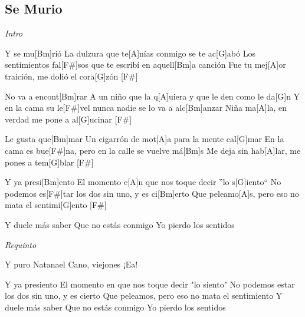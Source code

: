 \subsection{Se Murio}
\noindent

\vspace{1cm}

\begin{guitar}
	\begin{multicols}{2}
		\textit{Intro}
		\par

		Y se mu[Bm]rió
		La dulzura que te[A]nías conmigo se te ac[G]abó
		Los sentimientos fal[F#]sos que te escribí en aquell[Bm]a canción
		Fue tu mej[A]or traición, me dolió el cora[G]zón [F#] \par
		No va a encont[Bm]rar
		A un niño que la q[A]uiera y que le den como le da[G]n
		Y en la cama su le[F#]vel nunca nadie se lo va a alc[Bm]anzar
		Niña ma[A]la, en verdad me pone a al[G]ucinar [F#] \par
		Le gusta que[Bm]mar
		Un cigarrón de mot[A]a para la mente cal[G]mar
		En la cama es bue[F#]na, pero en la calle se vuelve má[Bm]s
		Me deja sin hab[A]lar, me pones a tem[G]blar [F#] \par
		Y ya presi[Bm]ento
		El momento e[A]n que nos toque decir ''lo s[G]iento``
		No podemos es[F#]tar los dos sin uno, y es ci[Bm]erto
		Que peleamo[A]s, pero eso no mata el sentimi[G]ento [F#] \par
		Y duele más saber
		Que no estás conmigo
		Yo pierdo los sentidos 
			\par 
			\textit{Requinto}
			\par
		Y puro Natanael Cano, viejones
		¡Ea! 
		\par
		Y ya presiento
		El momento en que nos toque decir "lo siento"
		No podemos estar los dos sin uno, y es cierto
		Que peleamos, pero eso no mata el sentimiento
		Y duele más saber
		Que no estás conmigo
		Yo pierdo los sentidos
	\end{multicols}
\end{guitar}
